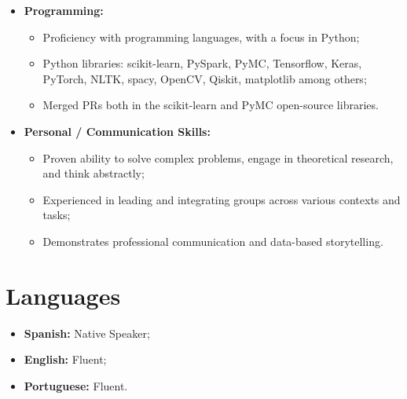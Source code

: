 \documentclass[11pt,a4paper,sans]{moderncv}        %
\begin{document}
\begin{itemize}

\item \textbf{Programming:} 
\begin{itemize}
\item Proficiency with programming languages, with a focus in Python;
\item Python libraries: scikit-learn, PySpark, PyMC, Tensorflow, Keras, PyTorch, NLTK, spacy, OpenCV, Qiskit, matplotlib among others;
\item Merged PRs both in the scikit-learn and PyMC open-source libraries.
\end{itemize}

\item \textbf{Personal / Communication Skills:} 

\begin{itemize}
\item Proven ability to solve complex problems, engage in theoretical research, and think abstractly;
\vspace{1pt}
\item Experienced in leading and integrating groups across various contexts and tasks; 
\vspace{1pt}
\item Demonstrates professional communication and data-based storytelling.

\end{itemize}

\end{itemize}
\section{Languages}
\vspace{4pt}
\begin{itemize}
\item{\textbf{Spanish:}} Native Speaker;
\item{\textbf{English:}} Fluent;
\item{\textbf{Portuguese:}} Fluent.
\end{itemize}
\end{document}
